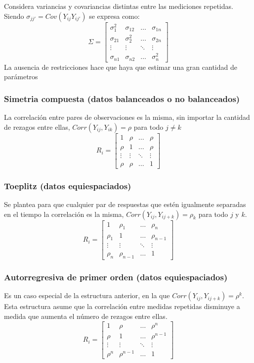 \documentclass[12pt]{article}
\begin{document}
Considera variancias y covariancias distintas entre las mediciones repetidas.
Siendo $\sigma_{jj'} = Cov(Y_{ij}Y_{ij'})$ se expresa como:
\[
\varSigma = 
\begin{bmatrix}
	\sigma_{1}^2 & \sigma_{12}  & \dots  & \sigma_{1n} \\
	\sigma_{21}  & \sigma_{2}^2 & \dots  & \sigma_{2n} \\
	\vdots 		 & \vdots	    & \ddots & \vdots	   \\
	\sigma_{n1}  & \sigma_{n2}  & \dots  & \sigma_{n}^2
\end{bmatrix}
\]
La ausencia de restricciones hace que haya que estimar una gran cantidad de parámetros

\subsubsection{Simetria compuesta (datos balanceados o no balanceados)}

La correlación entre pares de observaciones es la misma, sin importar la cantidad de rezagos entre ellas,
$Corr(Y_{ij}, Y_{ik}) = \rho $ para todo $j \neq k$
\[
R_i =
\begin{bmatrix}
	1      & \rho   & \dots  & \rho \\
	\rho   & 1      & \dots  & \rho \\
	\vdots & \vdots	& \ddots & \vdots \\
	\rho   & \rho   & \dots  & 1
\end{bmatrix}
\]

\subsubsection{Toeplitz (datos equiespaciados)}
Se plantea para que cualquier par de respuestas que estén igualmente separadas en el tiempo la correlación es la misma,
$Corr(Y_{ij},Y_{ij+k}) = \rho_{k}$ para todo $j$ y $k$.
\[
R_i =
\begin{bmatrix}
	1      & \rho_1 	& \dots  & \rho_n \\
	\rho_1 & 1     		& \dots  & \rho_{n-1} \\
	\vdots & \vdots		& \ddots & \vdots \\
	\rho_n & \rho_{n-1} & \dots  & 1
\end{bmatrix}
\]

\subsubsection{Autorregresiva de primer orden (datos equiespaciados)}
Es un caso especial de la estructura anterior, en la que $Corr(Y_{ij}, Y_{ij+k}) = \rho^k$. Esta estructura asume que la
correlación entre medidas repetidas disminuye a medida que aumenta el número de rezagos entre ellas.
\[
R_i =
\begin{bmatrix}
	1      & \rho 	    & \dots  & \rho^n \\
	\rho   & 1     		& \dots  & \rho^{n-1} \\
	\vdots & \vdots		& \ddots & \vdots \\
	\rho^n & \rho^{n-1} & \dots  & 1
\end{bmatrix}
\]
\end{document}
